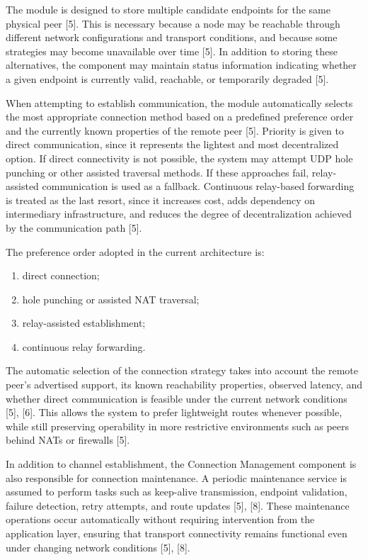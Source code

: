 \documentclass[12pt,a4paper]{article}
\begin{document}
The module is designed to store multiple candidate endpoints for the same physical peer [5]. This is necessary because a node may be reachable through different network configurations and transport conditions, and because some strategies may become unavailable over time [5]. In addition to storing these alternatives, the component may maintain status information indicating whether a given endpoint is currently valid, reachable, or temporarily degraded [5].

When attempting to establish communication, the module automatically selects the most appropriate connection method based on a predefined preference order and the currently known properties of the remote peer [5]. Priority is given to direct communication, since it represents the lightest and most decentralized option. If direct connectivity is not possible, the system may attempt UDP hole punching or other assisted traversal methods. If these approaches fail, relay-assisted communication is used as a fallback. Continuous relay-based forwarding is treated as the last resort, since it increases cost, adds dependency on intermediary infrastructure, and reduces the degree of decentralization achieved by the communication path [5].

The preference order adopted in the current architecture is:
\begin{enumerate}
    \item direct connection;
    \item hole punching or assisted NAT traversal;
    \item relay-assisted establishment;
    \item continuous relay forwarding.
\end{enumerate}

The automatic selection of the connection strategy takes into account the remote peer's advertised support, its known reachability properties, observed latency, and whether direct communication is feasible under the current network conditions [5], [6]. This allows the system to prefer lightweight routes whenever possible, while still preserving operability in more restrictive environments such as peers behind NATs or firewalls [5].

In addition to channel establishment, the Connection Management component is also responsible for connection maintenance. A periodic maintenance service is assumed to perform tasks such as keep-alive transmission, endpoint validation, failure detection, retry attempts, and route updates [5], [8]. These maintenance operations occur automatically without requiring intervention from the application layer, ensuring that transport connectivity remains functional even under changing network conditions [5], [8].
\end{document}
